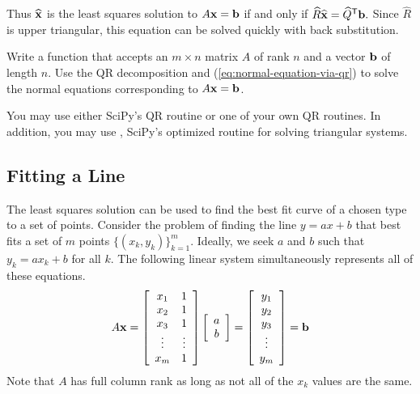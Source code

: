 Thus $\widehat{\mathbf{x}}$ is the least squares solution to $A\mathbf{x}=\mathbf{b}$ if and only if $\widehat{R}\widehat{\mathbf{x}} = \widehat{Q}^{\mathsf T}\mathbf{b}.$
Since $\widehat{R}$ is upper triangular, this equation can be solved quickly with back substitution.

\begin{problem} %
Write a function that accepts an $m \times n$ matrix $A$ of rank $n$ and a vector $\mathbf{b}$ of length $n$.
Use the QR decomposition and (\ref{eq:normal-equation-via-qr}) to solve the normal equations corresponding to $A\mathbf{x} = \mathbf{b}$.

You may use either SciPy's QR routine or one of your own QR routines.
In addition, you may use , SciPy's optimized routine for solving triangular systems.

\label{prob:lstsq-via-qr}
\end{problem}

\subsection*{Fitting a Line} %

The least squares solution can be used to find the best fit curve of a chosen type to a set of points.
Consider the problem of finding the line $y = ax + b$ that best fits a set of $m$ points $\{(x_k, y_k)\}_{k=1}^m$.
Ideally, we seek $a$ and $b$ such that $y_k = ax_k + b$ for all $k$.
The following linear system simultaneously represents all of these equations.
%
\begin{equation}
A\mathbf{x} =
\left[\begin{array}{cc}
x_1 & 1 \\
x_2 & 1 \\
x_3 & 1 \\
\vdots & \vdots \\
x_m & 1
\end{array}\right]
\left[\begin{array}{c} a \\ b \end{array}\right]
=
\left[\begin{array}{c} y_1 \\ y_2 \\ y_3 \\ \vdots \\ y_m \end{array}\right]
= \mathbf{b}
\label{eq:linear-least-squares}
\end{equation}
%
Note that $A$ has full column rank as long as not all of the $x_k$ values are the same.

